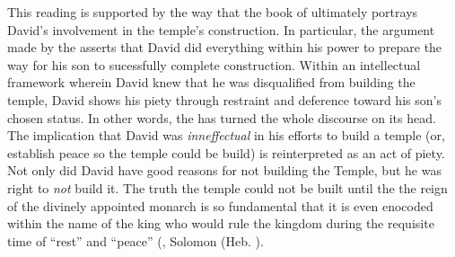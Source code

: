 This reading is supported by the way that the book of \chronicles ultimately portrays David's involvement in the temple's construction. In particular, the argument made by the \chronicler asserts that David did everything within his power to prepare the way for his son to sucessfully complete construction. Within an intellectual framework wherein David knew that he was disqualified from building the temple, David shows his piety through restraint and deference toward his son's chosen status. In other words, the \chronicler has turned the whole discourse on its head. The implication that David was \emph{inneffectual} in his efforts to build a temple (or, establish peace so the temple could be build) is reinterpreted as an act of piety. Not only did David have good reasons for not building the Temple, but he was right to \emph{not} build it. The truth the temple could not be built until the the reign of the divinely appointed monarch is so fundamental that it is even enocoded within the name of the king who would rule the kingdom during the requisite time of ``rest'' and ``peace'' (, Solomon (Heb. ).




